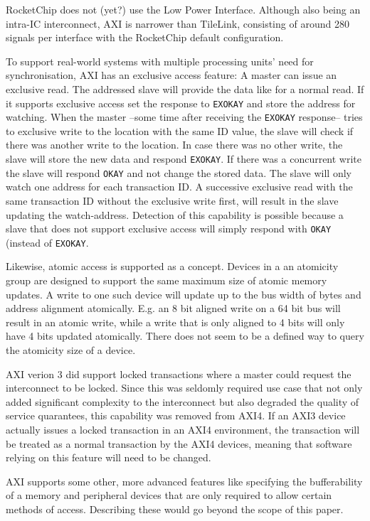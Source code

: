 \documentclass[journal,a4paper]{IEEEtran}
\begin{document}
RocketChip does not (yet?) use the Low Power Interface.
Although also being an intra-IC interconnect, AXI is narrower than TileLink, consisting of around 280 signals per interface with the RocketChip default configuration.

To support real-world systems with multiple processing units' need for synchronisation, AXI has an exclusive access feature: A master can issue an exclusive read.
The addressed slave will provide the data like for a normal read.
If it supports exclusive access set the response to \texttt{EXOKAY} and store the address for watching.
When the master --some time after receiving the \texttt{EXOKAY} response-- tries to exclusive write to the location with the same ID value, the slave will check if there was another write to the location.
In case there was no other write, the slave will store the new data and respond \texttt{EXOKAY}. If there was a concurrent write the slave will respond \texttt{OKAY} and not change the stored data. The slave will only watch one address for each transaction ID. A successive exclusive read with the same transaction ID without the exclusive write first, will result in the slave updating the watch-address.
Detection of this capability is possible because a slave that does not support exclusive access will simply respond with \texttt{OKAY} (instead of \texttt{EXOKAY}.

Likewise, atomic access is supported as a concept.
Devices in a an atomicity group are designed to support the same maximum size of atomic memory updates.
A write to one such device will update up to the bus width of bytes and address alignment atomically.
E.g. an 8 bit aligned write on a 64 bit bus will result in an atomic write, while a write that is only aligned to 4 bits will only have 4 bits updated atomically. There does not seem to be a defined way to query the atomicity size of a device.

AXI verion 3 did support locked transactions where a master could request the interconnect to be locked. Since this was seldomly required use case that not only added significant complexity to the interconnect but also degraded the quality of service quarantees, this capability was removed from AXI4. If an AXI3 device actually issues a locked transaction in an AXI4 environment, the transaction will be treated as a normal transaction by the AXI4 devices, meaning that software relying on this feature will need to be changed.

AXI supports some other, more advanced features like specifying the bufferability of a memory and peripheral devices that are only required to allow certain methods of access. Describing these would go beyond the scope of this paper.
\end{document}
